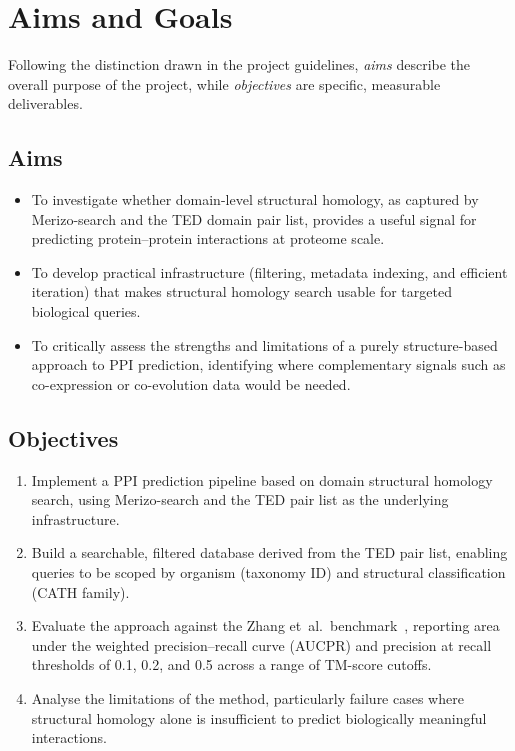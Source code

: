 \section{Aims and Goals}
\label{sec:intro-aims}

Following the distinction drawn in the project guidelines, \emph{aims} describe the overall purpose of the project, while \emph{objectives} are specific, measurable deliverables.

\subsection{Aims}

\begin{itemize}
    \item To investigate whether domain-level structural homology, as captured by Merizo-search and the TED domain pair list, provides a useful signal for predicting protein--protein interactions at proteome scale.
    \item To develop practical infrastructure (filtering, metadata indexing, and efficient iteration) that makes structural homology search usable for targeted biological queries.
    \item To critically assess the strengths and limitations of a purely structure-based approach to PPI prediction, identifying where complementary signals such as co-expression or co-evolution data would be needed.
\end{itemize}

\subsection{Objectives}

\begin{enumerate}
    \item Implement a PPI prediction pipeline based on domain structural homology search, using Merizo-search and the TED pair list as the underlying infrastructure.
    \item Build a searchable, filtered database derived from the TED pair list, enabling queries to be scoped by organism (taxonomy ID) and structural classification (CATH family).
    \item Evaluate the approach against the Zhang et~al.\ benchmark~\cite{zhang2025ppi}, reporting area under the weighted precision--recall curve (AUCPR) and precision at recall thresholds of 0.1, 0.2, and 0.5 across a range of TM-score cutoffs.
    \item Analyse the limitations of the method, particularly failure cases where structural homology alone is insufficient to predict biologically meaningful interactions.
\end{enumerate}


